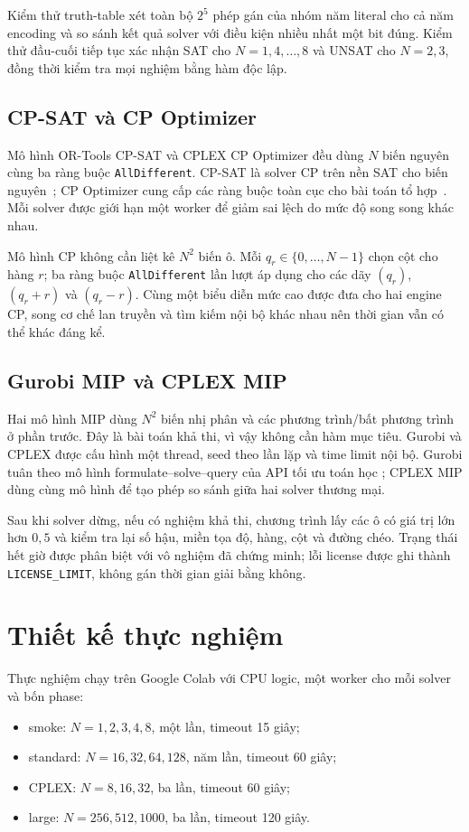 \documentclass[a4paper,fleqn]{cas-sc}
\begin{document}
Kiểm thử truth-table xét toàn bộ $2^5$ phép gán của nhóm năm literal cho cả
năm encoding và so sánh kết quả solver với điều kiện nhiều nhất một bit
đúng. Kiểm thử đầu-cuối tiếp tục xác nhận SAT cho $N=1,4,\ldots,8$ và
UNSAT cho $N=2,3$, đồng thời kiểm tra mọi nghiệm bằng hàm độc lập.

\subsection{CP-SAT và CP Optimizer}

Mô hình OR-Tools CP-SAT và CPLEX CP Optimizer đều dùng $N$ biến nguyên cùng ba
ràng buộc \texttt{AllDifferent}. CP-SAT là solver CP trên nền SAT cho biến
nguyên~\cite{ortools-cpsat}; CP Optimizer cung cấp các ràng buộc toàn cục cho
bài toán tổ hợp~\cite{ibm-cp}. Mỗi solver được giới hạn một worker để giảm sai
lệch do mức độ song song khác nhau.

Mô hình CP không cần liệt kê $N^2$ biến ô. Mỗi $q_r\in\{0,\ldots,N-1\}$
chọn cột cho hàng $r$; ba ràng buộc \texttt{AllDifferent} lần lượt áp dụng
cho các dãy $(q_r)$, $(q_r+r)$ và $(q_r-r)$. Cùng một biểu diễn mức cao
được đưa cho hai engine CP, song cơ chế lan truyền và tìm kiếm nội bộ khác
nhau nên thời gian vẫn có thể khác đáng kể.

\subsection{Gurobi MIP và CPLEX MIP}

Hai mô hình MIP dùng $N^2$ biến nhị phân và các phương trình/bất phương trình
ở phần trước. Đây là bài toán khả thi, vì vậy không cần hàm mục tiêu. Gurobi và
CPLEX được cấu hình một thread, seed theo lần lặp và time limit nội bộ. Gurobi
tuân theo mô hình formulate--solve--query của API tối ưu toán học
\cite{gurobi-manual}; CPLEX MIP dùng cùng mô hình để tạo phép so sánh giữa hai
solver thương mại.

Sau khi solver dừng, nếu có nghiệm khả thi, chương trình lấy các ô có giá trị
lớn hơn $0{,}5$ và kiểm tra lại số hậu, miền tọa độ, hàng, cột và đường chéo.
Trạng thái hết giờ được phân biệt với vô nghiệm đã chứng minh; lỗi license
được ghi thành \texttt{LICENSE\_LIMIT}, không gán thời gian giải bằng không.

\section{Thiết kế thực nghiệm}

Thực nghiệm chạy trên Google Colab với \ResultCpuCount{} CPU logic, một worker
cho mỗi solver và bốn phase:
\begin{itemize}
  \item smoke: $N=1,2,3,4,8$, một lần, timeout 15 giây;
  \item standard: $N=16,32,64,128$, năm lần, timeout 60 giây;
  \item CPLEX: $N=8,16,32$, ba lần, timeout 60 giây;
  \item large: $N=256,512,1000$, ba lần, timeout 120 giây.
\end{itemize}
\end{document}
